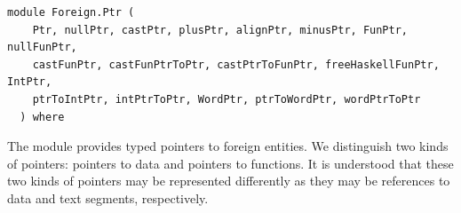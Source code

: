 \label{module:Foreign.Ptr}
\haddockbeginheader
{\haddockverb\begin{verbatim}
module Foreign.Ptr (
    Ptr, nullPtr, castPtr, plusPtr, alignPtr, minusPtr, FunPtr, nullFunPtr,
    castFunPtr, castFunPtrToPtr, castPtrToFunPtr, freeHaskellFunPtr, IntPtr,
    ptrToIntPtr, intPtrToPtr, WordPtr, ptrToWordPtr, wordPtrToPtr
  ) where\end{verbatim}}
\haddockendheader

The module  provides typed pointers to foreign entities. We
 distinguish two kinds of pointers: pointers to data and pointers to
 functions. It is understood that these two kinds of pointers may be
 represented differently as they may be references to data and text segments,
 respectively.\par

